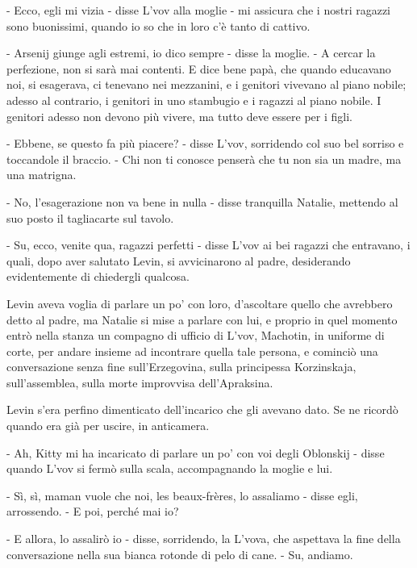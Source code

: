 - Ecco, egli mi vizia - disse L'vov alla moglie - mi assicura che i nostri ragazzi sono buonissimi, quando io so che in loro c'è tanto di cattivo. 

- Arsenij giunge agli estremi, io dico sempre - disse la moglie. - A cercar la perfezione, non si sarà mai contenti. E dice bene papà, che quando educavano noi, si esagerava, ci tenevano nei mezzanini, e i genitori vivevano al piano nobile; adesso al contrario, i genitori in uno stambugio e i ragazzi al piano nobile. I genitori adesso non devono più vivere, ma tutto deve essere per i figli. 

- Ebbene, se questo fa più piacere? - disse L'vov, sorridendo col suo bel sorriso e toccandole il braccio. - Chi non ti conosce penserà che tu non sia un madre, ma una matrigna. 

- No, l'esagerazione non va bene in nulla - disse tranquilla Natalie, mettendo al suo posto il tagliacarte sul tavolo. 

- Su, ecco, venite qua, ragazzi perfetti - disse L'vov ai bei ragazzi che entravano, i quali, dopo aver salutato Levin, si avvicinarono al padre, desiderando evidentemente di chiedergli qualcosa. 

Levin aveva voglia di parlare un po' con loro, d'ascoltare quello che avrebbero detto al padre, ma Natalie si mise a parlare con lui, e proprio in quel momento entrò nella stanza un compagno di ufficio di L'vov, Machotin, in uniforme di corte, per andare insieme ad incontrare quella tale persona, e cominciò una conversazione senza fine sull'Erzegovina, sulla principessa Korzinskaja, sull'assemblea, sulla morte improvvisa dell'Apraksina. 

Levin s'era perfino dimenticato dell'incarico che gli avevano dato. Se ne ricordò quando era già per uscire, in anticamera. 

- Ah, Kitty mi ha incaricato di parlare un po' con voi degli Oblonskij - disse quando L'vov si fermò sulla scala, accompagnando la moglie e lui. 

- Sì, sì, maman vuole che noi, les beaux-frères, lo assaliamo - disse egli, arrossendo. - E poi, perché mai io? 

- E allora, lo assalirò io - disse, sorridendo, la L'vova, che aspettava la fine della conversazione nella sua bianca rotonde di pelo di cane. - Su, andiamo. 

